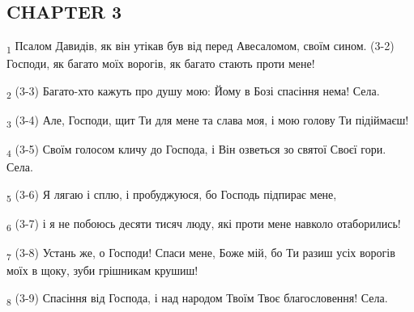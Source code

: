 \subsection{CHAPTER 3}
\begin{tcolorbox}
\textsubscript{1} Псалом Давидів, як він утікав був від перед Авесаломом, своїм сином. (3-2) Господи, як багато моїх ворогів, як багато стають проти мене!
\end{tcolorbox}
\begin{tcolorbox}
\textsubscript{2} (3-3) Багато-хто кажуть про душу мою: Йому в Бозі спасіння нема! Села.
\end{tcolorbox}
\begin{tcolorbox}
\textsubscript{3} (3-4) Але, Господи, щит Ти для мене та слава моя, і мою голову Ти підіймаєш!
\end{tcolorbox}
\begin{tcolorbox}
\textsubscript{4} (3-5) Своїм голосом кличу до Господа, і Він озветься зо святої Своєї гори. Села.
\end{tcolorbox}
\begin{tcolorbox}
\textsubscript{5} (3-6) Я лягаю і сплю, і пробуджуюся, бо Господь підпирає мене,
\end{tcolorbox}
\begin{tcolorbox}
\textsubscript{6} (3-7) і я не побоюсь десяти тисяч люду, які проти мене навколо отаборились!
\end{tcolorbox}
\begin{tcolorbox}
\textsubscript{7} (3-8) Устань же, о Господи! Спаси мене, Боже мій, бо Ти разиш усіх ворогів моїх в щоку, зуби грішникам крушиш!
\end{tcolorbox}
\begin{tcolorbox}
\textsubscript{8} (3-9) Спасіння від Господа, і над народом Твоїм Твоє благословення! Села.
\end{tcolorbox}
